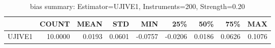 \begin{table}[ht]
\centering
\caption{bias summary: Estimator=UJIVE1, Instruments=200, Strength=0.20}
\begin{tabular}{lrrrrrrrr}
\toprule
 & COUNT & MEAN & STD & MIN & 25\% & 50\% & 75\% & MAX \\
\midrule
UJIVE1 & 10.0000 & 0.0193 & 0.0601 & -0.0757 & -0.0206 & 0.0186 & 0.0626 & 0.1076 \\
\bottomrule
\end{tabular}
\end{table}
